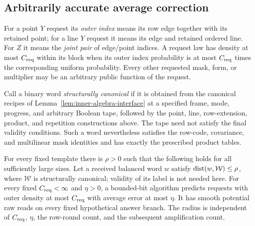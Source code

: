 \subsection{Arbitrarily accurate average correction}
\label{ib:average-correction-section}

For a point \(Y\) request its \emph{outer index} means its row
edge together with its retained point; for a line \(Y\) request
it means its edge and retained ordered line.  For \(Z\) it means
the \emph{joint pair} of edge/point indices.  A request law has
density at most \(C_{\rm req}\) within its block when its outer
index probability is at most \(C_{\rm req}\) times the corresponding
uniform probability.  Every other requested mask, form, or multiplier
may be an arbitrary public function of the request.

Call a binary word \emph{structurally canonical} if it is obtained from
the canonical recipes of Lemma~\ref{lem:inner-algebra-interface} at a
specified frame, mode, progress, and arbitrary Boolean tape, followed by
the point, line, row-extension, product, and repetition constructions
above. The tape need not satisfy the final validity conditions. Such a
word nevertheless satisfies the row-code, covariance, and multilinear
mask identities and has exactly the prescribed product tables.

\begin{proposition}
\label{ib:average-correction}
For every fixed template there is \(\rho>0\) such that the following
holds for all sufficiently large sizes.  Let a received balanced
word \(w\) satisfy \(\operatorname{dist}(w,\mathcal W)\le\rho\), where
\(\mathcal W\) is structurally canonical; validity of its label
is not needed here.  For every fixed \(C_{\rm req}<\infty\) and
\(\eta>0\), a bounded-bit algorithm predicts requests with outer
density at most \(C_{\rm req}\) with average error at most \(\eta\).
It has smooth potential raw reads on every fixed hypothetical answer
branch.  The radius is independent of \(C_{\rm req}\), \(\eta\),
the row-round count, and the subsequent amplification count.
\end{proposition}

